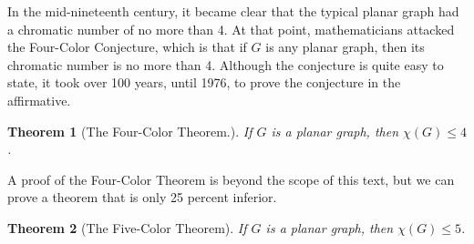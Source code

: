 \documentclass[10pt,]{book}
\theoremstyle{plain}
\newtheorem{theorem}{Theorem}[section]
\theoremstyle{definition}
\theoremstyle{definition}
\theoremstyle{definition}
\theoremstyle{definition}
\theoremstyle{definition}
\numberwithin{equation}{section}
\begin{document}
%
\par
In the mid-nineteenth century, it became clear that the typical planar graph had a chromatic number of no more than 4. At that point, mathematicians
attacked the Four-Color Conjecture, which is that if \(G\) is any planar graph, then its chromatic number is no more than 4. Although the conjecture
is quite easy to state, it took over 100 years, until 1976, to prove the conjecture in the affirmative.%
\begin{theorem}[The Four-Color Theorem.]\label{theorem-four-color-theorem}
If \(G\) is a planar graph, then \(\chi (G)\leq 4\).%
\end{theorem}
\par
A proof of the Four-Color Theorem is beyond the scope of this text, but we can prove a theorem that is only 25 percent inferior.%
\begin{theorem}[The Five-Color Theorem]\label{theorem-five-color-theorem}
If \(G\) is a planar graph, then \(\chi (G)\leq 5\).%
\end{theorem}
\end{document}
